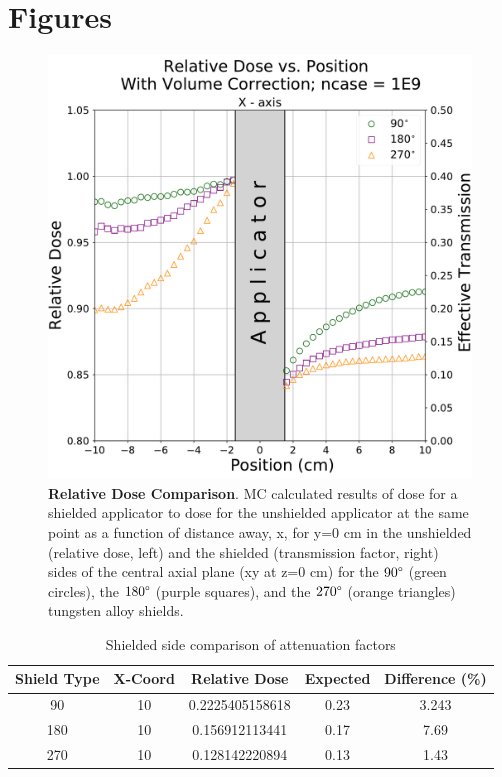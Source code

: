 \documentclass[12pt]{article}
\begin{document}
\section{Figures}

\begin{figure}
	\centering
	\includegraphics[scale=0.3]{relative_dosage_comparison}
	\caption{\textbf{Relative Dose Comparison}. MC calculated results of dose for a shielded applicator to dose for the unshielded applicator at the same point as a function of distance away, x, for y=0 cm in the unshielded (relative dose, left) and the shielded (transmission factor, right) sides of the central axial plane (xy at z=0 cm) for the $ 90\degree $ (green circles), the $ 180\degree $ (purple squares), and the $ 270\degree $ (orange triangles) tungsten alloy shields.}
\end{figure}

\FloatBarrier

\begin{table}[]
	\centering
	\caption{Shielded side comparison of attenuation factors}
	\label{my-label}
	\begin{tabular}{|c|c|c|c|c|}
		\hline
		Shield Type & X-Coord & Relative Dose   & Expected & Difference (\%) \\
		\hline
		90          & 10      & 0.2225405158618 & 0.23     & 3.243           \\
		\hline
		180         & 10      & 0.156912113441  & 0.17     & 7.69            \\
		\hline
		270         & 10      & 0.128142220894  & 0.13     & 1.43            \\
		\hline
	\end{tabular}
\end{table}   	
\end{document}
